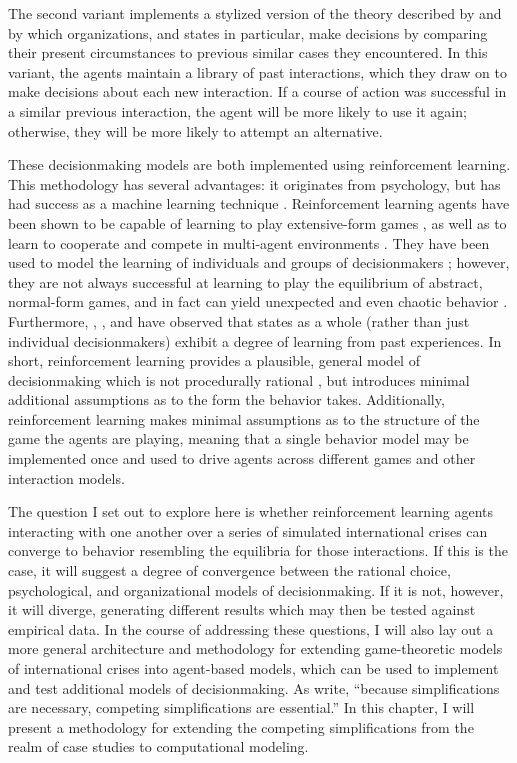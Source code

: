 The second variant implements a stylized version of the theory described by \citet{march_1993} and \citet{khong_1992} by which organizations, and states in particular, make decisions by comparing their present circumstances to previous similar cases they encountered. In this variant, the agents maintain a library of past interactions, which they draw on to make decisions about each new interaction. If a course of action was successful in a similar previous interaction, the agent will be more likely to use it again; otherwise, they will be more likely to attempt an alternative.

These decisionmaking models are both implemented using reinforcement learning. This methodology has several advantages: it originates from psychology, but has had success as a machine learning technique \citep{sutton_1998}. Reinforcement learning agents have been shown to be capable of learning to play extensive-form games \citep{laslier_2005,akramizadeh_2009}, as well as to learn to cooperate and compete in multi-agent environments \citep{littman_1994,claus_1998}. They have been used to model the learning of individuals and groups of decisionmakers \citep{kocher_2005}; however, they are not always successful at learning to play the equilibrium of abstract, normal-form games, and in fact can yield unexpected and even chaotic behavior \citep{galla_2013}. Furthermore, \citet{khong_1992}, \citet{allison_1999}, and \citet{cederman_2001} have observed that states as a whole (rather than just individual decisionmakers) exhibit a degree of learning from past experiences. In short, reinforcement learning provides a plausible, general model of decisionmaking which is not procedurally rational \citep{simon_1976}, but introduces minimal additional assumptions as to the form the behavior takes. Additionally, reinforcement learning makes minimal assumptions as to the structure of the game the agents are playing, meaning that a single behavior model may be implemented once and used to drive agents across different games and other interaction models. %

The question I set out to explore here is whether reinforcement learning agents interacting with one another over a series of simulated international crises can converge to behavior resembling the equilibria for those interactions. If this is the case, it will suggest a degree of convergence between the rational choice, psychological, and organizational models of decisionmaking. If it is not, however, it will diverge, generating different results which may then be tested against empirical data. In the course of addressing these questions, I will also lay out a more general architecture and methodology for extending game-theoretic models of international crises into agent-based models, which can be used to implement and test additional models of decisionmaking. As \citet{allison_1999} write, ``because  simplifications are necessary, competing simplifications are essential.'' In this chapter, I will present a methodology for extending the competing simplifications from the realm of case studies to computational modeling.

